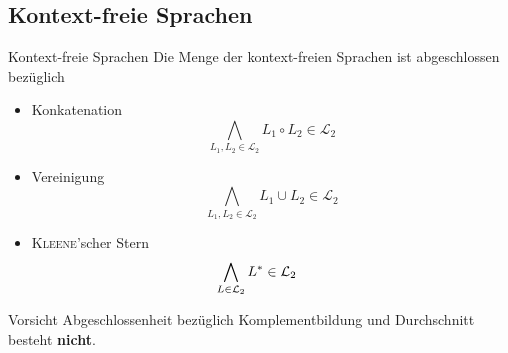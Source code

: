 \documentclass[]{beamer}
\begin{document}
\subsection{Kontext-freie Sprachen}
\begin{frame}[squeeze]{}
  \begin{block}{Kontext-freie Sprachen}
    Die Menge der kontext-freien Sprachen ist abgeschlossen bezüglich
    \begin{itemize}
      \item Konkatenation
            \[\bigwedge_{L_1, L_2 \in \mathcal{L}_2} L_1 \circ L_2 \in \mathcal{L}_2\]
      \item Vereinigung \\
            \[\bigwedge_{L_1, L_2 \in \mathcal{L}_2} L_1 \cup L_2 \in \mathcal{L}_2\]
      \item \textsc{Kleene}'scher Stern \\
            \[\bigwedge_{L \in \mathcal{L}_2} L^* \in \mathcal{L}_2 \hspace*{2.2em}\]
    \end{itemize}
  \end{block}
  
  \pause
  \vspace*{-0.5em}
  
  \begin{alertblock}{Vorsicht}
    Abgeschlossenheit bezüglich Komplementbildung und Durchschnitt besteht \textbf{nicht}.
  \end{alertblock}
\end{frame}
\end{document}
